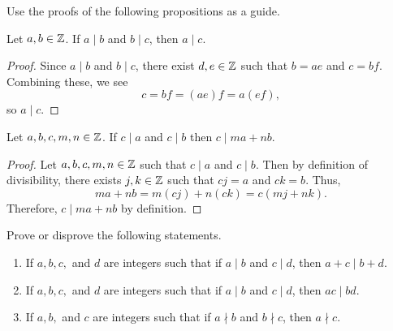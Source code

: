 \documentclass[handout,nooutcomes]{ximera}
\date{\classday, 2024}
\begin{document}
\handoutAbstract
\maketitle

Use the proofs of the following propositions as a guide.

\begin{proposition}%
    Let $a,b\in\mathbb Z$. If $a\mid b$ and $b \mid c$, then $a\mid c$.
    \begin{proof}
        Since $a\mid b$ and $b \mid c$, there exist $d,e\in\mathbb Z$ such that $b=ae$ and $c=bf$. Combining these, we see \[c=bf=(ae)f=a(ef),\] so $a\mid c$.
    \end{proof}
\end{proposition}



\begin{proposition}%
    Let $a,b,c,m,n\in\mathbb Z$.
    If $c\mid a$ and $c\mid b$ then $c\mid ma+nb$.

    \begin{proof}
        Let $a,b,c,m,n\in\mathbb Z$ such that $c\mid a$ and $c\mid b$. Then by definition of divisibility, there exists $j,k\in\mathbb Z$ such that $cj=a$ and $ck=b$. Thus, \[ma+nb=m(cj)+n(ck)=c(mj+nk).\] Therefore, $c\mid ma+nb$ by definition.
    \end{proof}
\end{proposition}

\begin{br}%
    Prove or disprove the following statements.
    \begin{enumerate}
        \item If $a,b,c,$ and $d$ are integers such that if $a\mid b$ and $c\mid d$, then $a+c\mid b+d$.
        \item If $a,b,c,$ and $d$ are integers such that if $a\mid b$ and $c\mid d$, then $ac\mid bd$.
        \item If $a,b,$ and $c$ are integers such that if $a\nmid b$ and $b\nmid c$, then $a\nmid c$.
    \end{enumerate}
\end{br}

\pdfOnly{\ifhandout{
    \vfill
    \vfill}
\else
\fi}
\end{document}

